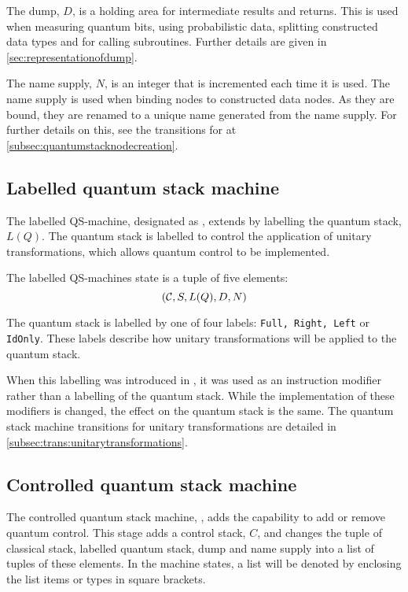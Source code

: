 The dump, $D$, is a holding area for intermediate results and returns. This
is used when measuring quantum bits,  using probabilistic data, 
splitting constructed data types and for calling subroutines. Further
details are given in \vref{sec:representationofdump}.


The name supply, $N$, is an integer that is incremented each
time it is used. The name supply is used when binding nodes to 
constructed data nodes. As they are bound, they are renamed to a unique name
generated from the name supply. For further details on this, see 
the transitions for  at \vref{subsec:quantumstacknodecreation}.

\subsection{Labelled quantum stack machine}\label{subsec:labelledmachinestate}

The labelled QS-machine, designated as \lbms, extends  \bms{} by
labelling the quantum stack, $L(Q)$. The quantum stack is labelled to 
control the application of
 unitary transformations, which allows quantum control to
be implemented.

The labelled QS-machines state is a tuple of five elements:
\begin{equation}
(\mathcal{C},S,L(Q),D,N)\label{eq:minimalmachinestateplus}
\end{equation}

The quantum stack is labelled by one of four labels: 
\texttt{Full, Right, Left} or 
\texttt{IdOnly}. These labels 
describe how unitary transformations will be applied to  the quantum stack.

When this labelling was introduced in \cite{giles:msc2}, it 
was used as an instruction modifier rather than a labelling of the
quantum stack. While the implementation of these modifiers  is
changed, the effect on the quantum stack is the same. The quantum stack
machine transitions for unitary transformations are detailed 
in  \vref{subsec:trans:unitarytransformations}.


\subsection{Controlled quantum stack machine}\label{subsec:controlledmachinestate}

The controlled quantum stack machine, \cms, adds the capability to 
 add or remove quantum control.
This stage  adds a control stack, $C$, and changes the 
 tuple of classical stack, labelled quantum stack, dump
and name supply into a  list of tuples of these elements. In the 
machine states, a list will be denoted by enclosing the list items
or types in square brackets.

